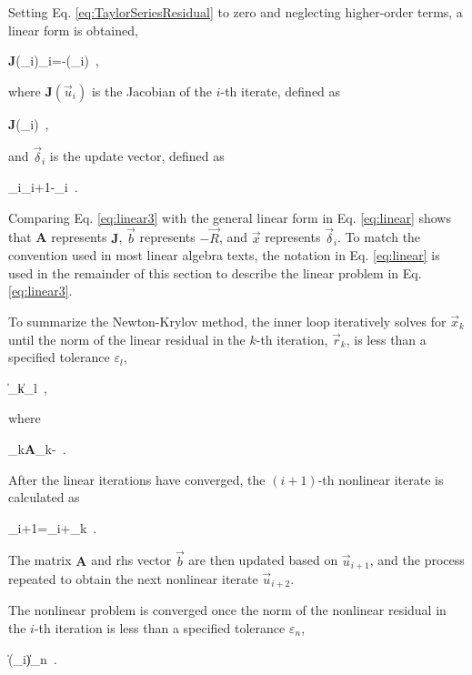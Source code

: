 \noindent Setting Eq. \eqref{eq:TaylorSeriesResidual} to zero and neglecting higher-order terms, a linear form is obtained,

\beq
\label{eq:linear3}
\textbf{J}(_i)\vec{\delta}_i=-(_i)\ ,
\eeq

\noindent where \(\textbf{J}(\vec{u}_i)\) is the Jacobian of the \(i\)-th iterate, defined as

\beq
\label{eq:JacobianDef}
\textbf{J}(_i)\equiv{}\ ,
\eeq

\noindent and \(\vec{\delta}_i\) is the update vector, defined as

\beq
\label{eq:update}
\vec{\delta}_i\equiv{}_{i+1}-_i\ .
\eeq

\noindent Comparing Eq. \eqref{eq:linear3} with the general linear form in Eq. \eqref{eq:linear} shows that \textbf{A} represents \(\textbf{J}\), \(\vec{b}\) represents \(-\vec{R}\), and \(\vec{x}\) represents \(\vec{\delta}_i\). To match the convention used in most linear algebra texts, the notation in Eq. \eqref{eq:linear} is used in the remainder of this section to describe the linear problem in Eq. \eqref{eq:linear3}.

To summarize the Newton-Krylov method, the inner loop iteratively solves for \(\vec{x}_k\) until the norm of the linear residual in the \(k\)-th iteration, \(\vec{r}_k\), is less than a specified tolerance \(\varepsilon_l\),

\beq
\label{eq:convergence_linear}
\|_k\|\leq\varepsilon_l\ ,
\eeq 

\noindent where

\beq
\label{eq:linear_residual}
_k\equiv\textbf{A}_k-\ .
\eeq

\noindent After the linear iterations have converged, the \((i+1)\)-th nonlinear iterate is calculated as

\beq
{}_{i+1}=_i+_k\ .
\eeq

\noindent The matrix \(\textbf{A}\) and \gls{rhs} vector \(\vec{b}\) are then updated based on \(\vec{u}_{i+1}\), and the process repeated to obtain the next nonlinear iterate \(\vec{u}_{i+2}\). 

The nonlinear problem is converged once the norm of the nonlinear residual in the \(i\)-th iteration is less than a specified tolerance \(\varepsilon_n\),

\beq
\|(_i)\|\leq\varepsilon_n\ .
\eeq

